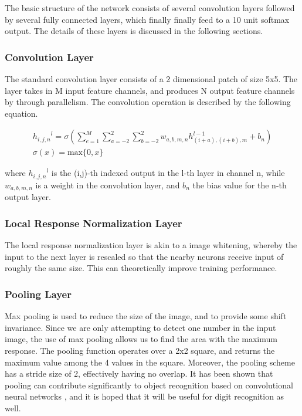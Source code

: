 \documentclass{article} %
\begin{document}
The basic structure of the network consists of several convolution layers followed by several fully connected layers, which finally finally feed to a 10 unit softmax output. The details of these layers is discussed in the following sections. 

\subsubsection{Convolution Layer}

The standard convolution layer consists of a 2 dimensional patch of size 5x5. The layer takes in M input feature channels, and produces N output feature channels by through parallelism. The convolution operation is described by the following equation. 

\begin{gather}
{h_{i,j,n}}^l = \sigma(\sum_{e=1}^{M}{\sum_{a=-2}^{2}{\sum_{b=-2}^{2} w_{a,b,m,n}h_{(i+a),(i+b),m}^{l-1}} + b_n}) \\
\sigma(x) = \text{max}\{0, x\}
\end{gather}

where ${h_{i,j,n}}^l$ is the (i,j)-th indexed output in the l-th layer in channel n, while $w_{a,b,m,n}$ is a weight in the convolution layer, and $b_n$ the bias value for the n-th output layer. 

\subsubsection{Local Response Normalization Layer}

The local response normalization layer is akin to a image whitening, whereby the input to the next layer is rescaled so that the nearby neurons receive input of roughly the same size. This can theoretically improve training performance. 

\subsubsection{Pooling Layer} 

Max pooling is used to reduce the size of the image, and to provide some shift invariance. Since we are only attempting to detect one number in the input image, the use of max pooling allows us to find the area with the maximum response. The pooling function operates over a 2x2 square, and returns the maximum value among the 4 values in the square. Moreover, the pooling scheme has a stride size of 2, effectively having no overlap. It has been shown that pooling can contribute significantly to object recognition based on convolutional neural networks \cite{pooling}, and it is hoped that it will be useful for digit recognition as well. 
\end{document}
